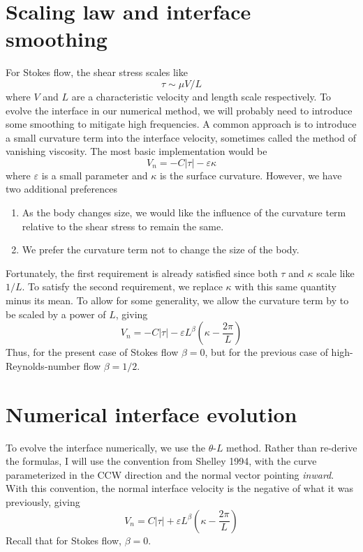 \documentclass[11pt]{article}
\newcommand{\abs}[1]{\left| #1 \right|}
\newcommand{\eps}{\varepsilon}
\newcommand{\atau}{\abs{\tau}}
\begin{document}
\section{Scaling law and interface smoothing}
For Stokes flow, the shear stress scales like
\begin{equation}
\tau \sim \mu V/L
\end{equation}
where $V$ and $L$ are a characteristic velocity and length scale respectively. To evolve the interface in our numerical method, we will probably need to introduce some smoothing to mitigate high frequencies. A common approach is to introduce a small curvature term into the interface velocity, sometimes called the method of vanishing viscosity. The most basic implementation would be
\begin{equation}
V_n = - C \atau - \eps \kappa
\end{equation}
where $\eps$ is a small parameter and $\kappa$ is the surface curvature. However, we have two additional preferences
\begin{enumerate}
\item As the body changes size, we would like the influence of the curvature term relative to the shear stress to remain the same.
\item We prefer the curvature term not to change the size of the body.
\end{enumerate}
Fortunately, the first requirement is already satisfied since both $\tau$ and $\kappa$ scale like $1/L$. To satisfy the second requirement, we replace $\kappa$ with this same quantity minus its mean. To allow for some generality, we allow the curvature term by to be scaled by a power of $L$, giving
\begin{equation}
V_n = - C \atau - \eps L^{\beta} \left(\kappa - \frac{2 \pi}{L} \right)
\end{equation}
Thus, for the present case of Stokes flow $\beta=0$, but for the previous case of high-Reynolds-number flow $\beta=1/2$.

\section{Numerical interface evolution}

To evolve the interface numerically, we use the $\theta$-$L$ method. Rather than re-derive the formulas, I will use the convention from Shelley 1994, with the curve parameterized in the CCW direction and the normal vector pointing {\em inward}. With this convention, the normal interface velocity is the negative of what it was previously, giving
\begin{equation}
V_n = C \atau + \eps L^{\beta} \left(\kappa - \frac{2 \pi}{L} \right)
\end{equation}
Recall that for Stokes flow, $\beta = 0$.
\end{document}
